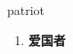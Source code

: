 
\begin{frame}
{\huge patriot}
\begin{center}
\begin{enumerate}\Large
  \item \textbf{爱国者}
\end{enumerate}
\end{center}
\end{frame}
